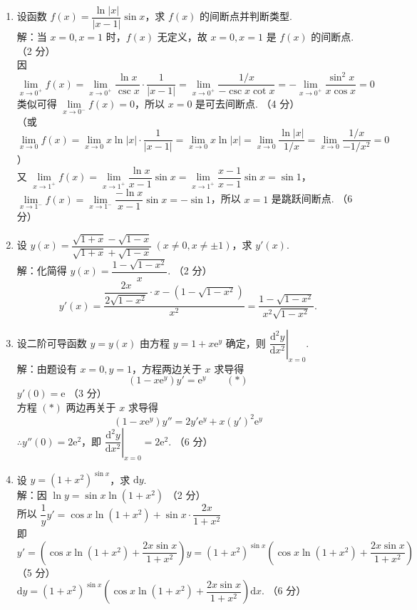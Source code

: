 \documentclass[a4paper,11pt]{ctexart}
\newcommand{\e}{\mathrm{e}}
\newcommand{\dd}{\mathrm{d}}
\newcommand{\score}[1]{\hfill（#1）}
\begin{document}
\begin{enumerate}[label=\arabic*., leftmargin=2em, itemsep=1.0em, topsep=0.5em]
  \item 设函数 $f(x) = \dfrac{\ln|x|}{|x-1|}\sin x$，求 $f(x)$ 的间断点并判断类型.\\[0.3em]
  解：当 $x = 0, x = 1$ 时，$f(x)$ 无定义，故 $x = 0, x = 1$ 是 $f(x)$ 的间断点. \score{2 分}\\[0.2em]
  因 $\lim\limits_{x\to 0^+} f(x) = \lim\limits_{x\to 0^+}\dfrac{\ln x}{\csc x}\cdot\dfrac{1}{|x-1|} = \lim\limits_{x\to 0^+}\dfrac{1/x}{-\csc x\cot x} = -\lim\limits_{x\to 0^+}\dfrac{\sin^2 x}{x\cos x} = 0$\\[0.2em]
  类似可得 $\lim\limits_{x\to 0^-} f(x) = 0$，所以 $x = 0$ 是可去间断点. \score{4 分}\\[0.2em]
  （或 $\lim\limits_{x\to 0} f(x) = \lim\limits_{x\to 0} x\ln|x|\cdot\dfrac{1}{|x-1|} = \lim\limits_{x\to 0} x\ln|x| = \lim\limits_{x\to 0}\dfrac{\ln|x|}{1/x} = \lim\limits_{x\to 0}\dfrac{1/x}{-1/x^2} = 0$）\\[0.3em]
  又 $\lim\limits_{x\to 1^+} f(x) = \lim\limits_{x\to 1^+}\dfrac{\ln x}{x-1}\sin x = \lim\limits_{x\to 1^+}\dfrac{x-1}{x-1}\sin x = \sin 1$，\\[0.2em]
  $\lim\limits_{x\to 1^-} f(x) = \lim\limits_{x\to 1^-}\dfrac{-\ln x}{x-1}\sin x = -\sin 1$，所以 $x = 1$ 是跳跃间断点. \score{6 分}

  \item 设 $y(x) = \dfrac{\sqrt{1+x} - \sqrt{1-x}}{\sqrt{1+x} + \sqrt{1-x}}~(x\neq 0, x\neq\pm 1)$，求 $y'(x)$.\\[0.3em]
  解：化简得 $y(x) = \dfrac{1 - \sqrt{1-x^2}}{x}$. \score{2 分}
  \[
    y'(x) = \frac{\dfrac{2x}{2\sqrt{1-x^2}}\cdot x - \left(1 - \sqrt{1-x^2}\right)}{x^2} = \frac{1 - \sqrt{1-x^2}}{x^2\sqrt{1-x^2}}. \tag*{（6 分）}
  \]

  \item 设二阶可导函数 $y = y(x)$ 由方程 $y = 1 + x\e^y$ 确定，则 $\left.\dfrac{\dd^2 y}{\dd x^2}\right|_{x=0}$.\\[0.3em]
  解：由题设有 $x = 0, y = 1$，方程两边关于 $x$ 求导得
  \[
    (1 - x\e^y)y' = \e^y \qquad (*)
  \]
  $y'(0) = \e$ \score{3 分}\\[0.2em]
  方程 $(*)$ 两边再关于 $x$ 求导得
  \[
    (1 - x\e^y)y'' = 2y'\e^y + x(y')^2\e^y \tag*{（5 分）}
  \]
  $\therefore y''(0) = 2\e^2$，即 $\left.\dfrac{\dd^2 y}{\dd x^2}\right|_{x=0} = 2\e^2$. \score{6 分}

  \item 设 $y = (1+x^2)^{\sin x}$，求 $\dd y$.\\[0.3em]
  解：因 $\ln y = \sin x \ln(1+x^2)$ \score{2 分}\\[0.2em]
  所以 $\dfrac{1}{y}y' = \cos x\ln(1+x^2) + \sin x\cdot\dfrac{2x}{1+x^2}$\\[0.2em]
  即 $y' = \left(\cos x\ln(1+x^2) + \dfrac{2x\sin x}{1+x^2}\right)y = (1+x^2)^{\sin x}\left(\cos x\ln(1+x^2) + \dfrac{2x\sin x}{1+x^2}\right)$ \score{5 分}\\[0.3em]
  $\dd y = (1+x^2)^{\sin x}\left(\cos x\ln(1+x^2) + \dfrac{2x\sin x}{1+x^2}\right)\dd x$. \score{6 分}


\end{enumerate}
\end{document}
